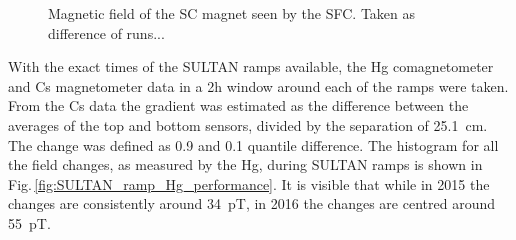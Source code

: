 \begin{figure}
  \centering
  \quad
  \caption{Magnetic field of the SC magnet seen by the SFC. Taken as difference of runs... }
\end{figure}

With the exact times of the SULTAN ramps available, the Hg comagnetometer and Cs magnetometer data in a 2h window around each of the ramps were taken. From the Cs data the gradient was estimated as the difference between the averages of the top and bottom sensors, divided by the separation of \SI{25.1}{\centi\meter}. The change was defined as 0.9 and 0.1 quantile difference. The histogram for all the field changes, as measured by the Hg, during SULTAN ramps is shown in Fig.\,\ref{fig:SULTAN_ramp_Hg_performance}. It is visible that while in 2015 the changes are consistently around \SI{34}{\pico\tesla}, in 2016 the changes are centred around \SI{55}{\pico\tesla}.



